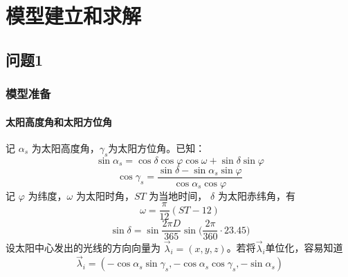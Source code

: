 \documentclass[../main.tex]{subfiles}
\begin{document}
\section{模型建立和求解}
\subsection{问题1}
\subsubsection{模型准备}
\paragraph{太阳高度角和太阳方位角}
记 \(\alpha _{s}\) 为太阳高度角，\(\gamma _{s}\)为太阳方位角。已知：
\begin{equation}
\sin \alpha _{s} = \cos \delta \cos \varphi \cos \omega + \sin \delta \sin \varphi
\end{equation}
\begin{equation}
\cos \gamma _{s} = \frac{\sin \delta -\sin \alpha_{s} \sin \varphi}{\cos \alpha _{s} \cos \varphi}
\end{equation}
记 \( \varphi\) 为纬度，\(\omega\) 为太阳时角，\(ST\) 为当地时间， \(\delta\) 为太阳赤纬角，有
\begin{equation}
\omega = \frac{\pi}{12} ( ST - 12)
\end{equation}
\begin{equation}
\sin \delta = \sin \frac{2 \pi D}{365} \sin \big(\frac{2\pi}{360} \cdot 23.45\big)
\end{equation}
设太阳中心发出的光线的方向向量为 \(\vec\lambda _{i} = (x,  y , z)\)。若将\(\vec \lambda_{i}\)单位化，容易知道
\begin{equation}
\vec \lambda _{i} = ({-} \cos \alpha _{s} \sin \gamma_{s} ,{-} \cos \alpha_{s} \cos \gamma_{s}, {-} \sin \alpha_{s}) 
\end{equation}
\end{document}
